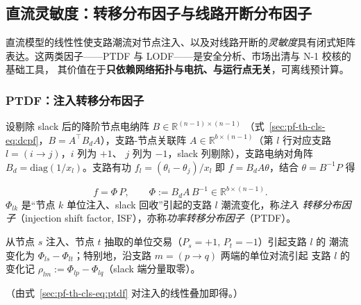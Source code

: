 \subsection{直流灵敏度：转移分布因子与线路开断分布因子}\label{sec:pf-th-cls-ptdf}

直流模型的线性性使支路潮流对节点注入、以及对线路开断的\emph{灵敏度}具有闭式矩阵
表达。这两类因子——PTDF 与 LODF——是安全分析、市场出清与 N-1 校核的基础工具，
其价值在于\textbf{只依赖网络拓扑与电抗、与运行点无关}，可离线预计算。

\subsubsection{PTDF：注入转移分布因子}
设剔除 slack 后的降阶节点电纳阵 $B\in\mathbb R^{(n-1)\times(n-1)}$
（式~\eqref{sec:pf-th-cls-eq:dcpf}，$B=A^{\top}B_dA$），支路-节点关联阵
$A\in\mathbb R^{b\times(n-1)}$（第 $l$ 行对应支路 $l=(i\!\to\!j)$，$i$ 列为 $+1$、
$j$ 列为 $-1$，slack 列剔除），支路电纳对角阵 $B_d=\mathrm{diag}(1/x_l)$。支路有功
$f_l=(\theta_i-\theta_j)/x_l$ 即 $f=B_dA\theta$，结合 $\theta=B^{-1}P$ 得

\begin{definition}\label{def:pf-th-cls-ptdf}
\begin{equation}
f=\Phi\,P,\qquad \Phi:=B_dA\,B^{-1}\in\mathbb R^{b\times(n-1)} .
\label{sec:pf-th-cls-eq:ptdf}
\end{equation}
$\Phi_{lk}$ 是“节点 $k$ 单位注入、slack 回收”引起的支路 $l$ 潮流变化，称\emph{注入
转移分布因子}（injection shift factor, ISF），亦称\emph{功率转移分布因子}（PTDF）。
\end{definition}

\begin{proposition}[点对点交易的支路灵敏度]\label{prop:pf-th-cls-ptdf-pair}
从节点 $s$ 注入、节点 $t$ 抽取的单位交易（$P_s{=}{+}1,\,P_t{=}{-}1$）引起支路 $l$ 的
潮流变化为 $\Phi_{ls}-\Phi_{lt}$；特别地，沿支路 $m=(p\!\to\!q)$ 两端的单位对流引起
支路 $l$ 的变化记 $\rho_{lm}:=\Phi_{lp}-\Phi_{lq}$（slack 端分量取零）。
\end{proposition}
（由式~\eqref{sec:pf-th-cls-eq:ptdf} 对注入的线性叠加即得。）

